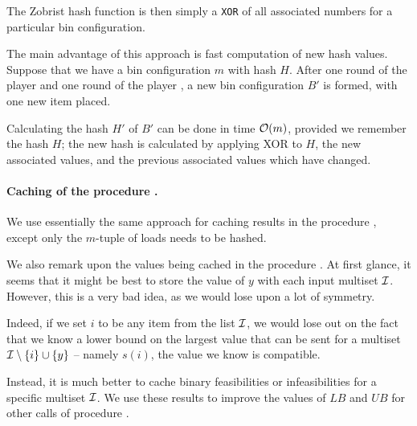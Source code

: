 The Zobrist hash function is then simply a \texttt{XOR} of all
associated numbers for a particular bin configuration.

The main advantage of this approach is fast computation of new hash
values.  Suppose that we have a bin configuration $m$ with hash
$H$. After one round of the player \adversary and one round of the
player \algo, a new bin configuration $B'$ is formed, with one new
item placed.

Calculating the hash $H'$ of $B'$ can be done in time ${\mathcal{O}}(m)$,
provided we remember the hash $H$; the new hash is calculated by
applying XOR to $H$, the new associated values, and the previous
associated values which have changed.



\paragraph{Caching of the procedure \MaxFeas.} We use essentially the
same approach for caching results in the procedure \MaxFeas, except
only the $m$-tuple of loads needs to be hashed.

We also remark upon the values being cached in the procedure \MaxFeas.
At first glance, it seems that it might be best to store the value of
$y$ with each input multiset ${\mathcal I}$. However, this is a very bad
idea, as we would lose upon a lot of symmetry.

Indeed, if we set $i$ to be any item from the list ${\mathcal I}$, we would
lose out on the fact that we know a lower bound on the largest value
that can be sent for a multiset ${\mathcal I} \setminus \{i\} \cup \{y\}$ --
namely $s(i)$, the value we know is compatible.

Instead, it is much better to cache binary feasibilities or
infeasibilities for a specific multiset ${\mathcal I}$. We use these results
to improve the values of $LB$ and $UB$ for other calls of procedure
\MaxFeas.


